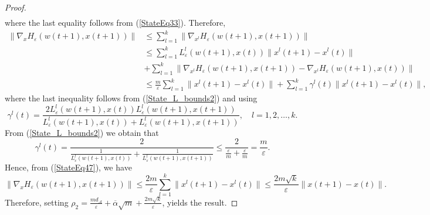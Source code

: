 \documentclass[12pt]{article}
\numberwithin{equation}{section}
\begin{document}
\begin{proof}
\begin{align}
\end{align}
where the last equality follows from (\ref{StateEq33}). Therefore,
\begin{align}
	\| \nabla_x H_{\varepsilon}(w(t+1),x(t+1)) \| 
	&\leq \sum\limits_{l=1}^{k} \| \nabla_{x^l} H_{\varepsilon}(w(t+1),x(t+1)) \| \\
	&\leq \sum\limits_{l=1}^{k} L^l_{\varepsilon}(w(t+1),x(t)) \|x^l(t+1) - x^l(t)\| \\
	&+ \sum\limits_{l=1}^{k} \| \nabla_{x^l} H_{\varepsilon}(w(t+1),x(t+1)) - \nabla_{x^l} H_{\varepsilon}(w(t+1),x(t))\| \\
	&\leq \frac{m}{\varepsilon} \sum\limits_{l=1}^{k} \|x^l(t+1)-x^l(t)\| + \sum\limits_{l=1}^{k} \gamma^l(t) \|x^l(t+1)-x^l(t)\| , \label{StateEq47}
\end{align}
where the last inequality follows from (\ref{State_L_bounds2}) and  using
\begin{equation*}
	\gamma^l(t) = \frac{2 L^l_{\varepsilon}(w(t+1),x(t)) L^l_{\varepsilon}(w(t+1),x(t+1))}{L^l_{\varepsilon}(w(t+1),x(t)) + L^l_{\varepsilon}(w(t+1),x(t+1))} , \quad l=1,2, \ldots, k.
\end{equation*}
From (\ref{State_L_bounds2}) we obtain that
\begin{equation*}
	\gamma^l(t) = \frac{2}{\frac{1}{L^l_{\varepsilon}(w(t+1),x(t))} + \frac{1}{L^l_{\varepsilon}(w(t+1),x(t+1))}} \leq \frac{2}{\frac{\varepsilon}{m} + \frac{\varepsilon}{m}} = \frac{m}{\varepsilon} .
\end{equation*}
Hence, from (\ref{StateEq47}), we have 
\begin{equation}
	\| \nabla_x H_{\varepsilon}(w(t+1),x(t+1))\| \leq \frac{2m}{\varepsilon} \sum\limits_{l=1}^{k} \|x^l(t+1)-x^l(t)\| \leq \frac{2m\sqrt{k}}{\varepsilon} \|x(t+1) - x(t)\|. \label{lipschitz_grad_x_H}
\end{equation}
Therefore, setting $\rho_2 =  \frac{m d_{\mathcal{A}}}{\varepsilon} + \overline{\alpha}\sqrt{m} + \frac{2m\sqrt{k}}{\varepsilon}$, yields the result.
\end{proof}
\end{document}
